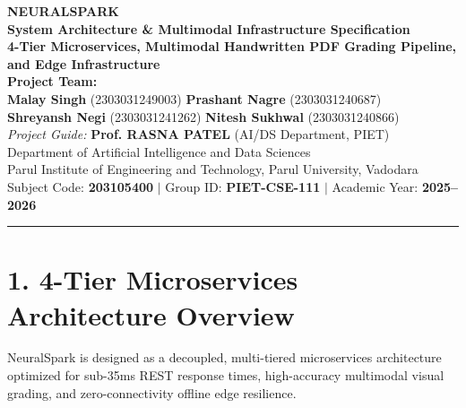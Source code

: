 \documentclass[11pt,a4paper]{article}
\begin{document}
\begin{center}
    {\Huge\bfseries\textcolor{primaryblue}{NEURALSPARK}}\\[0.15cm]
    {\Large\bfseries System Architecture \& Multimodal Infrastructure Specification}\\[0.2cm]
    {\normalsize\textbf{4-Tier Microservices, Multimodal Handwritten PDF Grading Pipeline, and Edge Infrastructure}}\\[0.3cm]
    
    \textbf{Project Team:}\\
    \textbf{Malay Singh} (2303031249003) \quad \textbf{Prashant Nagre} (2303031240687)\\
    \textbf{Shreyansh Negi} (2303031241262) \quad \textbf{Nitesh Sukhwal} (2303031240866)\\[0.15cm]
    
    \textit{Project Guide:} \textbf{Prof. RASNA PATEL} (AI/DS Department, PIET)\\[0.05cm]
    \small Department of Artificial Intelligence and Data Sciences\\
    Parul Institute of Engineering and Technology, Parul University, Vadodara\\
    Subject Code: \textbf{203105400} \quad $\mid$ \quad Group ID: \textbf{PIET-CSE-111} \quad $\mid$ \quad Academic Year: \textbf{2025--2026}
\end{center}

\vspace{0.1cm}
\hrule
\vspace{0.3cm}

\section{1. 4-Tier Microservices Architecture Overview}
\noindent
NeuralSpark is designed as a decoupled, multi-tiered microservices architecture optimized for sub-35ms REST response times, high-accuracy multimodal visual grading, and zero-connectivity offline edge resilience.
\end{document}
